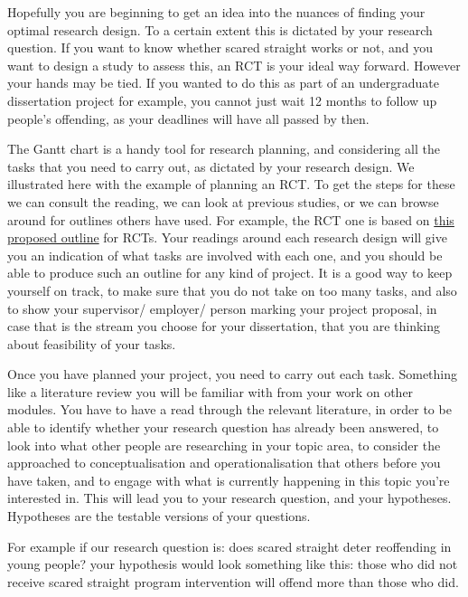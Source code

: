 \documentclass[]{book}
\theoremstyle{definition}
\theoremstyle{definition}
\theoremstyle{definition}
\theoremstyle{remark}
\begin{document}
Hopefully you are beginning to get an idea into the nuances of finding
your optimal research design. To a certain extent this is dictated by
your research question. If you want to know whether scared straight
works or not, and you want to design a study to assess this, an RCT is
your ideal way forward. However your hands may be tied. If you wanted to
do this as part of an undergraduate dissertation project for example,
you cannot just wait 12 months to follow up people's offending, as your
deadlines will have all passed by then.

The Gantt chart is a handy tool for research planning, and considering
all the tasks that you need to carry out, as dictated by your research
design. We illustrated here with the example of planning an RCT. To get
the steps for these we can consult the reading, we can look at previous
studies, or we can browse around for outlines others have used. For
example, the RCT one is based on
\href{https://www.healthknowledge.org.uk/e-learning/epidemiology/practitioners/introduction-study-design-is-rct}{this
proposed outline} for RCTs. Your readings around each research design
will give you an indication of what tasks are involved with each one,
and you should be able to produce such an outline for any kind of
project. It is a good way to keep yourself on track, to make sure that
you do not take on too many tasks, and also to show your supervisor/
employer/ person marking your project proposal, in case that is the
stream you choose for your dissertation, that you are thinking about
feasibility of your tasks.

Once you have planned your project, you need to carry out each task.
Something like a literature review you will be familiar with from your
work on other modules. You have to have a read through the relevant
literature, in order to be able to identify whether your research
question has already been answered, to look into what other people are
researching in your topic area, to consider the approached to
conceptualisation and operationalisation that others before you have
taken, and to engage with what is currently happening in this topic
you're interested in. This will lead you to your research question, and
your hypotheses. Hypotheses are the testable versions of your questions.

For example if our research question is: does scared straight deter
reoffending in young people? your hypothesis would look something like
this: those who did not receive scared straight program intervention
will offend more than those who did.
\end{document}

